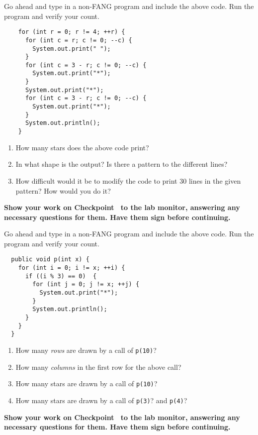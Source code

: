 \documentclass[12pt,oneside]{memoir}
\newcommand\code[1]{\lstinline^#1^}
\newenvironment{Checkpoint}[1]{%
  \begin{Exercise}[name={Checkpoint},title={#1}]}{%
  \end{Exercise}%
  \textbf{Show your work on Checkpoint~\theExercise{} to the lab monitor, %
    answering any necessary questions for them.  Have them sign before continuing.}}
\begin{document}
\begin{Checkpoint}{Nested Loops I}
  Go ahead and type in a non-FANG program and include the above
  code. Run the program and verify your count.

  \begin{lstlisting}
    for (int r = 0; r != 4; ++r) {
      for (int c = r; c != 0; --c) {
        System.out.print(" ");
      }
      for (int c = 3 - r; c != 0; --c) {
        System.out.print("*");
      }
      System.out.print("*");
      for (int c = 3 - r; c != 0; --c) {
        System.out.print("*");
      }      
      System.out.println();
    }
  \end{lstlisting}

  \begin{enumerate}
  \item How many stars does the above code print?
  \item In what shape is the output? Is there a pattern to the
    different lines?
  \item How difficult would it be to modify the code to print 30 lines
    in the given pattern? How would you do it?
  \end{enumerate}
\end{Checkpoint}

\begin{Checkpoint}{Parameters}
  Go ahead and type in a non-FANG program and include the above
  code. Run the program and verify your count.

  \begin{lstlisting}    
  public void p(int x) {
    for (int i = 0; i != x; ++i) {
      if ((i % 3) == 0)  {
        for (int j = 0; j != x; ++j) {
          System.out.print("*");
        }
        System.out.println();
      }
    }
  }
  \end{lstlisting}
  \begin{enumerate}
  \item How many \emph{rows} are drawn by a call of \code{p(10)}?
  \item How many \emph{columns} in the first row for the above call?
  \item How many stars are drawn by a call of \code{p(10)}?
  \item How many stars are drawn by a call of \code{p(3)}? and \code{p(4)}?
  \end{enumerate}
\end{Checkpoint}
\end{document}
